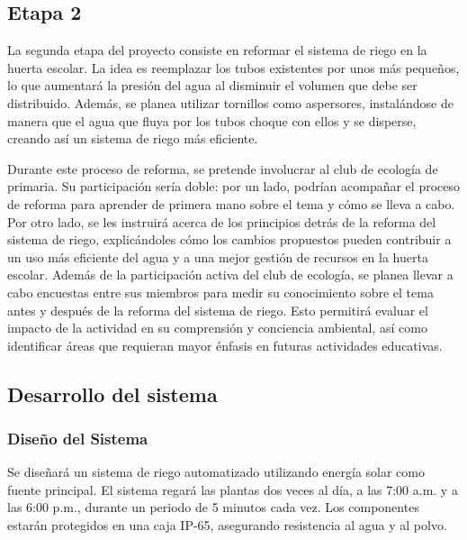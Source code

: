 \documentclass[12pt]{article}
\begin{document}
\subsection{Etapa 2}
La segunda etapa del proyecto consiste en reformar el sistema de riego en la huerta escolar. La idea es reemplazar los tubos existentes por unos más pequeños, lo que aumentará la presión del agua al disminuir el volumen que debe ser distribuido. Además, se planea utilizar tornillos como aspersores, instalándose de manera que el agua que fluya por los tubos choque con ellos y se disperse, creando así un sistema de riego más eficiente.

Durante este proceso de reforma, se pretende involucrar al club de ecología de primaria. Su participación sería doble: por un lado, podrían acompañar el proceso de reforma para aprender de primera mano sobre el tema y cómo se lleva a cabo. Por otro lado, se les instruirá acerca de los principios detrás de la reforma del sistema de riego, explicándoles cómo los cambios propuestos pueden contribuir a un uso más eficiente del agua y a una mejor gestión de recursos en la huerta escolar.
Además de la participación activa del club de ecología, se planea llevar a cabo encuestas entre sus miembros para medir su conocimiento sobre el tema antes y después de la reforma del sistema de riego. Esto permitirá evaluar el impacto de la actividad en su comprensión y conciencia ambiental, así como identificar áreas que requieran mayor énfasis en futuras actividades educativas.

\subsection{Desarrollo del sistema}
\subsubsection{Diseño del Sistema}
Se diseñará un sistema de riego automatizado utilizando energía solar como fuente principal. El sistema regará las plantas dos veces al día, a las 7:00 a.m. y a las 6:00 p.m., durante un periodo de 5 minutos cada vez. Los componentes estarán protegidos en una caja IP-65, asegurando resistencia al agua y al polvo.
\end{document}
